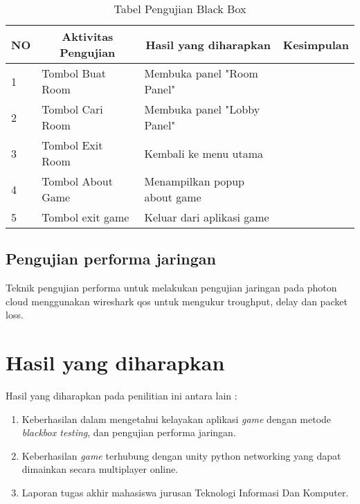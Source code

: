     \begin{table}[h]
    \centering
    \caption{Tabel Pengujian Black Box}
    \label{lab:tabel-pengujian}
    \begin{tabular}{|l|l|l|l|}
    \hline
    \multicolumn{1}{|c|}{NO} & \multicolumn{1}{c|}{Aktivitas Pengujian} & \multicolumn{1}{c|}{Hasil yang diharapkan} & \multicolumn{1}{c|}{Kesimpulan} \\ \hline
    1                        & Tombol Buat Room                         & Membuka panel "Room Panel"                 &                                 \\ \hline
    2                        & Tombol Cari Room                         & Membuka panel "Lobby Panel"                &                                 \\ \hline
    3                        & Tombol Exit Room                         & Kembali ke menu utama                      &                                 \\ \hline
    4                        & Tombol About Game                        & Menampilkan popup about game               &                                 \\ \hline
    5                        & Tombol exit game                         & Keluar dari aplikasi game                  &                                 \\ \hline
    \end{tabular}
    \end{table}
\newpage        
\subsection{Pengujian performa jaringan}
Teknik pengujian performa untuk melakukan pengujian jaringan pada photon cloud menggunakan wireshark qos untuk mengukur troughput, delay dan packet loss.
\section{Hasil yang diharapkan}
Hasil yang diharapkan pada penilitian ini antara lain :
\begin{enumerate}
    \item Keberhasilan dalam mengetahui kelayakan aplikasi \textit{game} dengan metode \textit{blackbox testing}, dan pengujian performa jaringan.
    \item Keberhasilan \textit{game} terhubung dengan unity python networking yang dapat dimainkan secara multiplayer online.
    \item Laporan tugas akhir mahasiswa jurusan Teknologi Informasi Dan Komputer.
\end{enumerate}